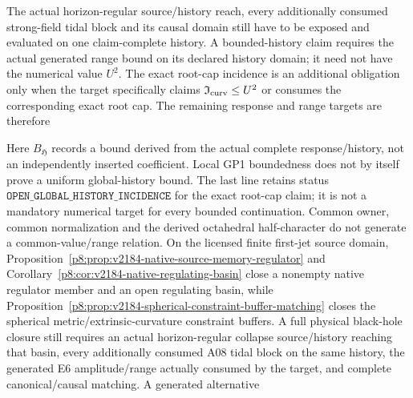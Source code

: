 \documentclass[12pt,a4paper]{article}
\begin{document}
\begin{remark}
The actual horizon-regular source/history reach, every additionally consumed
strong-field tidal block and its causal domain still have to be exposed and
evaluated on one claim-complete history.  A bounded-history claim requires the
actual generated range bound on its declared history domain; it need not have
the numerical value $U^2$.  The exact root-cap incidence is an additional
obligation only when the target specifically claims
$\mathfrak I_{\rm curv}\le U^2$ or consumes the corresponding exact root cap.
The remaining response and range targets are therefore
\begin{center}
\setlength{\fboxsep}{8pt}
\end{center}
Here $B_{\mathfrak H}$ records a bound derived from the actual complete
response/history, not an independently inserted coefficient.  Local GP1
boundedness does not by itself prove a uniform global-history bound.
The last line retains status
\(\texttt{OPEN\_GLOBAL\_HISTORY\_INCIDENCE}\) for the exact root-cap claim;
it is not a mandatory numerical target for every bounded continuation.
Common owner, common normalization and the derived octahedral half-character
do not generate a common-value/range relation.  On the licensed finite first-jet source domain,
Proposition~\ref{p8:prop:v2184-native-source-memory-regulator} and
Corollary~\ref{p8:cor:v2184-native-regulating-basin} close a nonempty native
regulator member and an open regulating basin, while
Proposition~\ref{p8:prop:v2184-spherical-constraint-buffer-matching} closes
the spherical metric/extrinsic-curvature constraint buffers.  A full physical
black-hole closure still requires an actual horizon-regular collapse
source/history reaching that basin, every additionally consumed A08 tidal
block on the same history, the generated E6 amplitude/range actually consumed
by the target, and complete canonical/causal matching.  A generated alternative

\end{remark}
\end{document}
